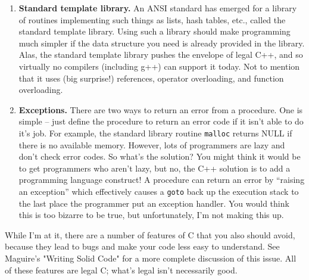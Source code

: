 \begin{enumerate}
\item {\bf Standard template library.} An ANSI standard has emerged for a
library of routines implementing such things as lists, hash tables,
etc., called the standard template library.  Using such a library
should make programming much simpler if the data structure you need
is already provided in the library.  Alas, the standard template
library pushes the envelope of legal C++, and so virtually no
compilers (including g++) can support it today.  Not to mention that
it uses (big surprise!) references, operator overloading, and
function overloading.

\item {\bf Exceptions.} There are two ways to return an error from
a procedure.  One is simple -- just define the procedure to return
an error code if it isn't able to do it's job.  For example,
the standard library routine {\tt malloc} returns NULL if there
is no available memory.  However, lots of programmers are lazy and
don't check error codes.  So what's the solution?  You might think
it would be to get programmers who aren't lazy, but no, the C++ solution
is to add a programming language construct!  A procedure can
return an error by ``raising an exception'' which effectively
causes a {\tt goto} back up the execution stack to the last
place the programmer put an exception handler.  You would think
this is too bizarre to be true, but unfortunately,
I'm not making this up.

\end{enumerate}

While I'm at it, there are a number of features of C that you also
should avoid, because they lead to bugs and make your code less easy
to understand.  See Maguire's "Writing Solid Code" for a more complete
discussion of this issue.  All of these features are legal C;
what's legal isn't necessarily good.


